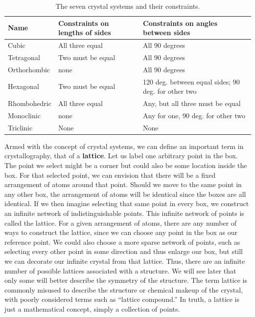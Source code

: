 \begin{table}
\centering
\caption{The seven crystal systems and their constraints.}
\label{tab:constraints}
\begin{tabular}{| l | p{} | p{} |}
\hline
Name & Constraints on lengths of sides & Constraints on angles between sides \\
\hline
Cubic & All three equal & All 90 degrees \\
\hline
Tetragonal & Two must be equal & All 90 degrees \\
\hline
Orthorhombic & none & All 90 degrees \\
\hline
Hexagonal & Two must be equal & 120 deg. between equal sides; 90 deg. for other two \\
\hline
Rhombohedric & All three equal & Any, but all three must be equal \\
\hline
Monoclinic & none & Any for one, 90 deg. for other two \\
\hline
Triclinic & None & None \\
\hline

\end{tabular}

\end{table}

 Armed with the concept of crystal systems, we can define an important term in crystallography, that of a \textbf{lattice}. 
Let us label one arbitrary point in the box. 
The point we select might be a corner but could also be some location inside the box. 
For that selected point, we can envision that there will be a fixed arrangement of atoms around that point. 
Should we move to the same point in any other box, the arrangement of atoms will be identical since the boxes are all identical. 
If we then imagine selecting that same point in every box, we construct an infinite network of indistinguishable points. This infinite network of points is called the lattice. For a given arrangement of atoms, there are any number of ways to construct the lattice, since we can choose any point in the box as our reference point. We could also choose a more sparse network of points, such as selecting every other point in some direction and thus enlarge our box, but still we can decorate our infinite crystal from that lattice. Thus, there are an infinite number of possible lattices associated with a structure. We will see later that only some will better describe the symmetry of the structure. The term lattice is commonly misused to describe the structure or chemical makeup of the crystal, with poorly considered terms such as ``lattice compound.'' In truth, a lattice is just a mathematical concept, simply a collection of points. 

